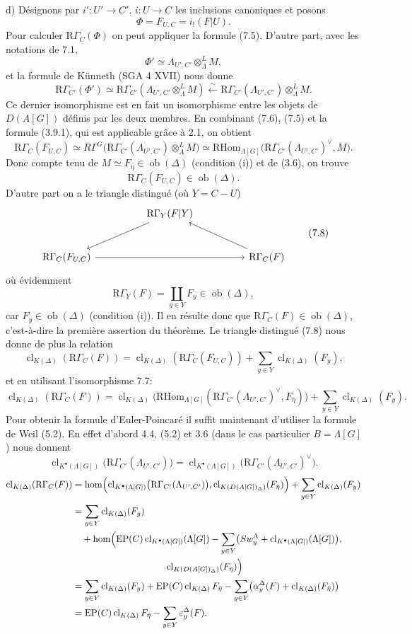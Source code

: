 \documentclass[11pt]{article}
\providecommand{\RHom}{\mathrm{RHom}}
\providecommand{\cl}{\operatorname{cl}}
\providecommand{\EP}{\operatorname{EP}}
\providecommand{\Ob}{\operatorname{ob}}
\providecommand{\RHom}{\mathrm{RHom}}
\providecommand{\RHom}{\mathrm R\mathcal{H}om}
\providecommand{\Ob}{\operatorname{ob}}
\providecommand{\cl}{\operatorname{cl}}
\providecommand{\EP}{\operatorname{EP}}
\providecommand{\Ob}{\operatorname{Ob}}
\providecommand{\clK}[1]{\operatorname{cl}_{K(#1)}}
\providecommand{\clKstar}[1]{\operatorname{cl}_{K^{\bullet}(#1)}}
\providecommand{\RG}{\mathrm R\Gamma}
\providecommand{\RHom}{\mathrm{RHom}}
\providecommand{\cl}{\operatorname{cl}}
\providecommand{\Ob}{\operatorname{ob}}
\providecommand{\Ob}{\operatorname{Ob}}
\begin{document}
d) Désignons par $i':U'\to C'$, $i:U\to C$ les inclusions canoniques et posons
\[
\Phi=F_{U,C}=i_!(F|U).
\]
Pour calculer $\RG_C(\Phi)$ on peut appliquer la formule (7.5). D'autre part, avec les notations de 7.1,
\[
\Phi'\simeq \Lambda_{U',C'}\otimes_\Lambda^L M,
\]
et la formule de Künneth (SGA 4 XVII) nous donne
\[
\RG_{C'}(\Phi')
\simeq
\RG_{C'}(\Lambda_{U',C'}\otimes_\Lambda^L M)
\xleftarrow{\sim}
\RG_{C'}(\Lambda_{U',C'})\otimes_\Lambda^L M.
\tag{7.6}
\]
Ce dernier isomorphisme est en fait un isomorphisme entre les objets de $D(A[G])$ définis par les deux membres. En combinant (7.6), (7.5) et la formule (3.9.1), qui est applicable grâce à 2.1, on obtient
\[
\RG_C(F_{U,C})
\simeq
R\Gamma^G\bigl(\RG_{C'}(\Lambda_{U',C'})\otimes_\Lambda^L M\bigr)
\simeq
\RHom_{\Lambda[G]}\bigl(\RG_{C'}(\Lambda_{U',C'})^\vee,M\bigr).
\tag{7.7}
\]
Donc compte tenu de $M\simeq F_{\bar\eta}\in\Ob(\Delta)$ (condition (i)) et de (3.6), on trouve
\[
\RG_C(F_{U,C})\in\Ob(\Delta).
\]
D'autre part on a le triangle distingué (où $Y=C-U$)
\[
\begin{tikzcd}[column sep=huge,row sep=large]
& \RG_Y(F|Y) \arrow[dl] & \\
\RG_C(F_{U,C}) \arrow[rr] && \RG_C(F) \arrow[ul]
\end{tikzcd}
\tag{7.8}
\]
où évidemment
\[
\RG_Y(F)=\coprod_{y\in Y}F_y\in\Ob(\Delta),
\]
car $F_y\in\Ob(\Delta)$ (condition (i)). Il en résulte donc que $\RG_C(F)\in\Ob(\Delta)$, c'est-à-dire la première assertion du théorème. Le triangle distingué (7.8) nous donne de plus la relation
\[
\clK{\Delta}(\RG_C(F))
=
\clK{\Delta}(\RG_C(F_{U,C}))
+\sum_{y\in Y}\clK{\Delta}(F_y),
\]
et en utilisant l'isomorphisme 7.7:
\[
\clK{\Delta}(\RG_C(F))
=
\clK{\Delta}\bigl(\RHom_{\Lambda[G]}(\RG_{C'}(\Lambda_{U',C'})^\vee,F_{\bar\eta})\bigr)
+\sum_{y\in Y}\clK{\Delta}(F_y).
\]
Pour obtenir la formule d'Euler-Poincaré il suffit maintenant d'utiliser la formule de Weil (5.2). En effet d'abord 4.4, (5.2) et 3.6 (dans le cas particulier $B=\Lambda[G]$) nous donnent
\[
\clKstar{\Lambda[G]}\bigl(\RG_{C'}(\Lambda_{U',C'})\bigr)
=
\clKstar{\Lambda[G]}\bigl(\RG_{C'}(\Lambda_{U',C'})^\vee\bigr).
\]
\[
\begin{aligned}
\clK{\Delta}(\RG_C(F))
&=\operatorname{hom}\Bigl(
\clKstar{\Lambda[G]}\bigl(\RG_{C'}(\Lambda_{U',C'})\bigr),
\cl_{K(D(A[G])_\Delta)}(F_{\bar\eta})\Bigr)
 +\sum_{y\in Y}\clK{\Delta}(F_y)\\
&=\sum_{y\in Y}\clK{\Delta}(F_y)\\
&\quad +\operatorname{hom}\Bigl(
\EP(C)\clKstar{\Lambda[G]}(\Lambda[G])
 -\sum_{y\in Y}\bigl(Sw_y^{\Lambda}+\clKstar{\Lambda[G]}(\Lambda[G])\bigr),\\
&\hspace{10em}\cl_{K(D(A[G])_\Delta)}(F_{\bar\eta})\Bigr)\\
&=\sum_{y\in Y}\clK{\Delta}(F_y)
 +\EP(C)\clK{\Delta}F_{\bar\eta}
 -\sum_{y\in Y}\bigl(\alpha_y^\Delta(F)+\clK{\Delta}(F_{\bar\eta})\bigr)\\
&=\EP(C)\clK{\Delta}F_{\bar\eta}
 -\sum_{y\in Y}\varepsilon_y^\Delta(F).
\end{aligned}
\]
\end{document}
